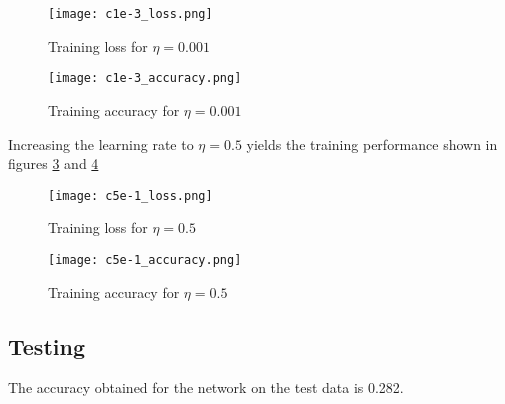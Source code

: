 \documentclass{article}
\begin{document}
\begin{figure}[H]
  \texttt{[image: c1e-3\_loss.png]}
  \caption{Training loss for $\eta = 0.001$}
  \label{fig:cifar_three_loss}
\end{figure}

\begin{figure}[H]
  \texttt{[image: c1e-3\_accuracy.png]}
  \caption{Training accuracy for $\eta = 0.001$}
  \label{fig:cifar_three_accuracy}
\end{figure}

Increasing the learning rate to $\eta = 0.5$ yields the training performance shown in figures
\ref{fig:cifar_one_loss} and \ref{fig:cifar_one_accuracy}

\begin{figure}[!ht]
  \texttt{[image: c5e-1\_loss.png]}
  \caption{Training loss for $\eta = 0.5$}
  \label{fig:cifar_one_loss}
\end{figure}

\begin{figure}[!ht]
  \texttt{[image: c5e-1\_accuracy.png]}
  \caption{Training accuracy for $\eta = 0.5$}
  \label{fig:cifar_one_accuracy}
\end{figure}

\subsection{Testing}
The accuracy obtained for the network on the test data is 0.282.
\end{document}
